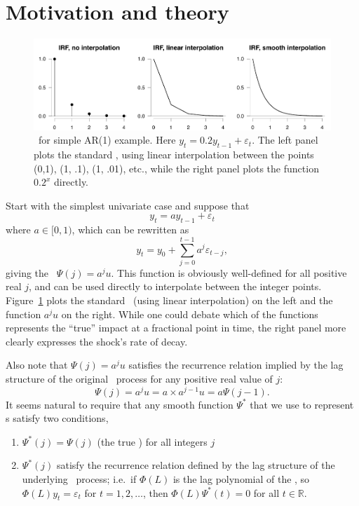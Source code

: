 \documentclass[12pt,fleqn]{article}
\newcommand{\vep}{\varepsilon}
\newcommand{\AR}{\allcaps{AR}}
\newcommand{\RR}{\mathbb{R}}
\begin{document}
\section{Motivation and theory}

\begin{figure}[t]
  \centering
  \includegraphics{graphs/motivation.pdf}
  \caption{\IRF\ for simple AR(1) example. Here $y_t = 0.2 y_{t-1} +
    \vep_t$. The left panel plots the standard \IRF, using linear
    interpolation between the points (0,1), (1, .1), (1, .01), etc.,
    while the right panel plots the function $0.2^x$ directly.}
  \label{f0}
\end{figure}

Start with the simplest univariate case and suppose that
\begin{equation}\label{eq:2}
y_t = a y_{t-1} + \vep_t
\end{equation}
where $a \in [0, 1)$, which can be rewritten as
\begin{equation}
  \label{eq:3}
  y_t = y_0 + \sum_{j=0}^{t-1} a^j \vep_{t-j},
\end{equation}
giving the \IRF\ $\Psi(j) = a^j u$. This function is obviously
well-defined for all positive real $j$, and can be used directly to
interpolate between the integer points. Figure~\ref{f0} plots the
standard \IRF\ (using linear interpolation) on the left and the
function $a^j u$ on the right. While one could debate which of the
functions represents the ``true'' impact at a fractional point in
time, the right panel more clearly expresses the shock's rate of
decay.

Also note that $\Psi(j) = a^j u$ satisfies the recurrence relation
implied by the lag structure of the original \AR\ process for any
positive real value of $j$:
\begin{equation*}
  \Psi(j) = a^j u = a \times a^{j-1} u = a \Psi(j-1).
\end{equation*}
It seems natural to require that any smooth function $\Psi^*$ that we
use to represent \IRF s satisfy two conditions,
\begin{enumerate}
\item $\Psi^*(j) = \Psi(j)$ (the true \IRF) for all integers $j$
\item $\Psi^*(j)$ satisfy the recurrence relation defined by the lag
  structure of the underlying \VAR\ process; i.e.\ if $\Phi(L)$ is the
  lag polynomial of the \VAR, so $\Phi(L)y_t = \vep_t$ for $t = 1, 2,
  \dots$, then $\Phi(L) \Psi^*(t) = 0$ for all $t \in \RR$.
\end{enumerate}
\end{document}
